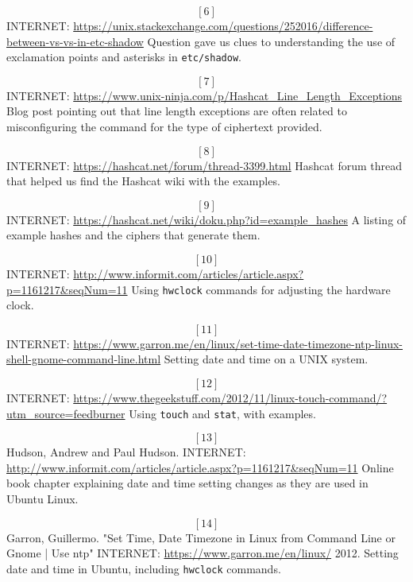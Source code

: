 \[[6]\] INTERNET:  \url{https://unix.stackexchange.com/questions/252016/difference-between-vs-vs-in-etc-shadow}
Question gave us clues to understanding the use of exclamation points and asterisks in \texttt{etc/shadow}.

\[[7]\] INTERNET:  \url{https://www.unix-ninja.com/p/Hashcat\_Line\_Length\_Exceptions}
Blog post pointing out that line length exceptions are often related to misconfiguring the command for the type of ciphertext provided.

\[[8]\] INTERNET:  \url{https://hashcat.net/forum/thread-3399.html}
Hashcat forum thread that helped us find the Hashcat wiki with the examples.

\[[9]\] INTERNET:  \url{https://hashcat.net/wiki/doku.php?id=example\_hashes}
A listing of example hashes and the ciphers that generate them.

\[[10]\] INTERNET:  \url{http://www.informit.com/articles/article.aspx?p=1161217\&seqNum=11}
Using \texttt{hwclock} commands for adjusting the hardware clock.

\[[11]\]  INTERNET:  \url{https://www.garron.me/en/linux/set-time-date-timezone-ntp-linux-shell-gnome-command-line.html}
Setting date and time on a UNIX system.

\[[12]\]  INTERNET:  \url{https://www.thegeekstuff.com/2012/11/linux-touch-command/?utm\_source=feedburner}
Using \texttt{touch} and \texttt{stat}, with examples.

\[[13]\]  Hudson, Andrew and Paul Hudson.  INTERNET: \url{http://www.informit.com/articles/article.aspx?p=1161217\&seqNum=11}
Online book chapter explaining date and time setting changes as they are used in Ubuntu Linux.

\[[14]\]  Garron, Guillermo.  "Set Time, Date Timezone in Linux from Command Line or Gnome | Use ntp" INTERNET: \url{https://www.garron.me/en/linux/} 2012.
Setting date and time in Ubuntu, including \texttt{hwclock} commands.

